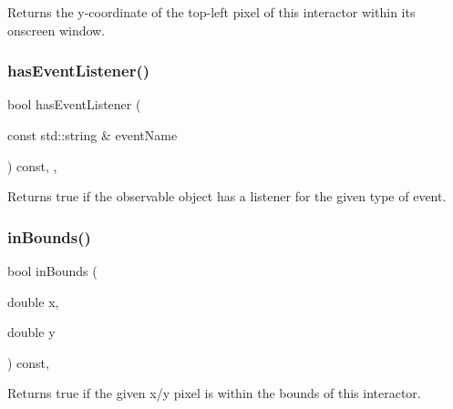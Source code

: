 Returns the y-\/coordinate of the top-\/left pixel of this interactor within its onscreen window. 

\mbox{\label{classsgl_1_1GObservable_a9f6faaa25942923bafa1c44020c49fa9}} 
\subsubsection{\texorpdfstring{has\+Event\+Listener()}{hasEventListener()}}
{\footnotesize\ttfamily bool has\+Event\+Listener (\begin{DoxyParamCaption}\item[{const std\+::string \&}]{event\+Name }\end{DoxyParamCaption}) const\hspace{0.3cm}{\ttfamily [protected]}, {\ttfamily [virtual]}, {\ttfamily [inherited]}}



Returns true if the observable object has a listener for the given type of event. 

\mbox{\label{classsgl_1_1GInteractor_afc480f652b8c5f1fb255e2269ce68879}} 
\subsubsection{\texorpdfstring{in\+Bounds()}{inBounds()}\hspace{0.1cm}{\footnotesize\ttfamily [1/2]}}
{\footnotesize\ttfamily bool in\+Bounds (\begin{DoxyParamCaption}\item[{double}]{x,  }\item[{double}]{y }\end{DoxyParamCaption}) const\hspace{0.3cm}{\ttfamily [virtual]}, {\ttfamily [inherited]}}



Returns true if the given x/y pixel is within the bounds of this interactor. 

\mbox{\label{classsgl_1_1GInteractor_ae6d7982c1c627b677a5e776ca86118ed}} 
